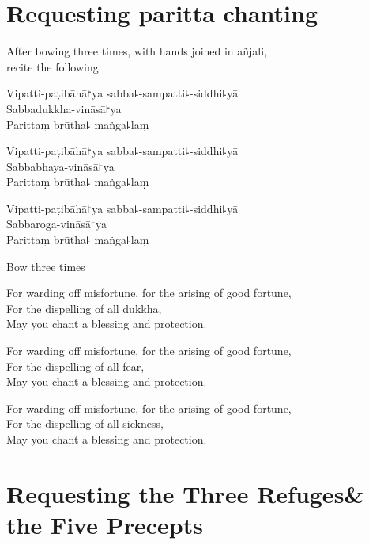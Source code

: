 \clearpage
\chapter{Requesting paritta chanting}%

\begin{instruction}
  After bowing three times, with hands joined in añjali,\\
  recite the following
\end{instruction}

Vipatti-paṭibāhā꜓ya sabba꜕-sampatti꜕-siddhi꜕yā\\
Sabbadukkha-vināsā꜓ya\\
Parittaṃ brūtha꜕ maṅga꜕laṃ

Vipatti-paṭibāhā꜓ya sabba꜕-sampatti꜕-siddhi꜕yā\\
Sabbabhaya-vināsā꜓ya\\
Parittaṃ brūtha꜕ maṅga꜕laṃ

Vipatti-paṭibāhā꜓ya sabba꜕-sampatti꜕-siddhi꜕yā\\
Sabbaroga-vināsā꜓ya\\
Parittaṃ brūtha꜕ maṅga꜕laṃ

\begin{instruction}
  Bow three times
\end{instruction}

\begin{english}
For warding off misfortune, for the arising of good fortune,\\
For the dispelling of all dukkha,\\
May you chant a blessing and protection.

For warding off misfortune, for the arising of good fortune,\\
For the dispelling of all fear,\\
May you chant a blessing and protection.

For warding off misfortune, for the arising of good fortune,\\
For the dispelling of all sickness,\\
May you chant a blessing and protection.
\end{english}

\setlength{\englishIndent}{\leaderIndent}

\clearpage
\chapter[Three Refuges \& the Five Precepts]{Requesting the Three Refuges\newline \& the Five Precepts}%

